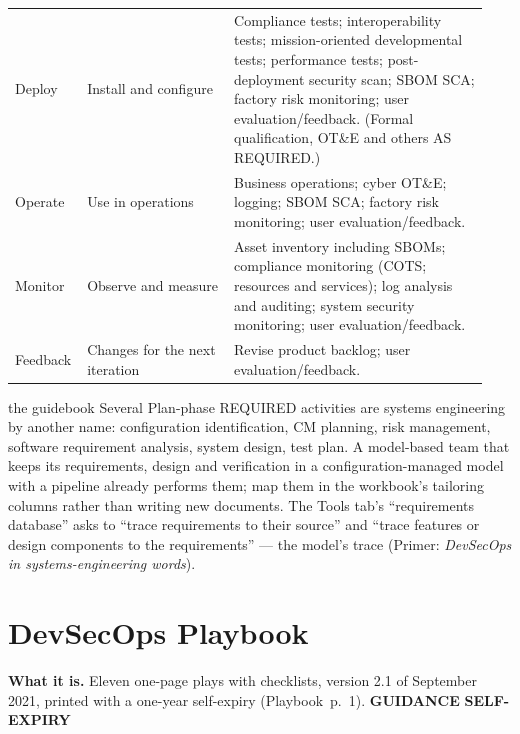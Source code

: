 \documentclass[11pt,letterpaper,twoside,openany]{memoir}
\newcommand{\pg}[2]{{\small(#1~p.~#2)}}          %
\newcommand{\st}[1]{{\sffamily\scriptsize\bfseries #1}}   %
\begin{document}
\begin{longtable}{@{}L{0.12\linewidth}L{0.30\linewidth}L{0.52\linewidth}@{}}
Deploy & Install and configure & Compliance tests; interoperability tests; mission-oriented developmental tests; performance tests; post-deployment security scan; SBOM SCA; factory risk monitoring; user evaluation/feedback. (Formal qualification, OT\&E and others AS REQUIRED.)\\
Operate & Use in operations & Business operations; cyber OT\&E; logging; SBOM SCA; factory risk monitoring; user evaluation/feedback.\\
Monitor & Observe and measure & Asset inventory including SBOMs; compliance monitoring (COTS; resources and services); log analysis and auditing; system security monitoring; user evaluation/feedback.\\
Feedback & Changes for the next iteration & Revise product backlog; user evaluation/feedback.\\
\end{longtable}

\begin{boxteam}{the guidebook}
Several Plan-phase REQUIRED activities are systems engineering by another name: configuration identification, CM
planning, risk management, software requirement analysis, system design, test plan. A model-based team that keeps its
requirements, design and verification in a configuration-managed model with a pipeline already performs them; map them
in the workbook's tailoring columns rather than writing new documents. The Tools tab's ``requirements database'' asks to
``trace requirements to their source'' and ``trace features or design components to the requirements'' --- the model's
trace (Primer: \emph{DevSecOps in systems-engineering words}).
\end{boxteam}

\section{DevSecOps Playbook}
\textbf{What it is.} Eleven one-page plays with checklists, version 2.1 of September 2021, printed with a one-year
self-expiry \pg{Playbook}{1}. \st{GUIDANCE} \st{SELF-EXPIRY}
\end{document}
